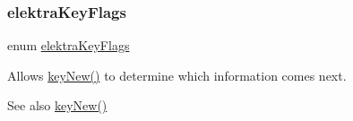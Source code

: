 \mbox{\label{group__key_ga9b703ca49f48b482def322b77d3e6bc8}} 
\subsubsection{\texorpdfstring{elektra\+Key\+Flags}{elektraKeyFlags}}
{\footnotesize\ttfamily enum \hyperlink{group__key_ga9b703ca49f48b482def322b77d3e6bc8}{elektra\+Key\+Flags}}



Allows \hyperlink{group__key_gad23c65b44bf48d773759e1f9a4d43b89}{key\+New()} to determine which information comes next. 

\begin{DoxySeeAlso}{See also}
\hyperlink{group__key_gad23c65b44bf48d773759e1f9a4d43b89}{key\+New()} 
\end{DoxySeeAlso}
